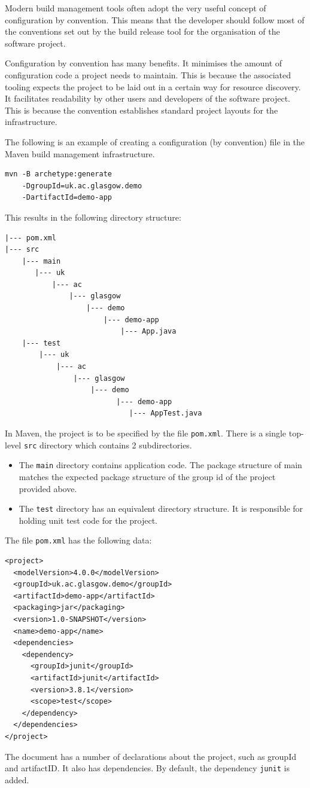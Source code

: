 \documentclass[a4paper, openany]{memoir}
\begin{document}
Modern build management tools often adopt the very useful concept of configuration by convention. This means that the developer should follow most of the conventions set out by the build release tool for the organisation of the software project.

Configuration by convention has many benefits. It minimises the amount of configuration code a project needs to maintain. This is because the associated tooling expects the project to be laid out in a certain way for resource discovery. It facilitates readability by other users and developers of the software project. This is because the convention establishes standard project layouts for the infrastructure. 


The following is an example of creating a configuration (by convention) file in the Maven build management infrastructure.
\begin{verbatim}
mvn -B archetype:generate 
    -DgroupId=uk.ac.glasgow.demo 
    -DartifactId=demo-app
\end{verbatim}
This results in the following directory structure:
\begin{verbatim}
|--- pom.xml
|--- src
    |--- main
       |--- uk
           |--- ac
               |--- glasgow
                   |--- demo
                       |--- demo-app
                           |--- App.java
    |--- test
        |--- uk
            |--- ac
                |--- glasgow
                    |--- demo
                          |--- demo-app
                             |--- AppTest.java
\end{verbatim}
In Maven, the project is to be specified by the file \texttt{pom.xml}. There is a single top-level \texttt{src} directory which contains 2 subdirectories.
\begin{itemize}
    \item The \texttt{main} directory contains application code. The package structure of main matches the expected package structure of the group id of the project provided above.
    \item The \texttt{test} directory has an equivalent directory structure. It is responsible for holding unit test code for the project.
\end{itemize}

The file \texttt{pom.xml} has the following data:
\begin{verbatim}
<project>
  <modelVersion>4.0.0</modelVersion>
  <groupId>uk.ac.glasgow.demo</groupId>
  <artifactId>demo-app</artifactId>
  <packaging>jar</packaging>
  <version>1.0-SNAPSHOT</version>
  <name>demo-app</name>
  <dependencies>
    <dependency>
      <groupId>junit</groupId>
      <artifactId>junit</artifactId>
      <version>3.8.1</version>
      <scope>test</scope>
    </dependency>
  </dependencies>
</project>
\end{verbatim}
The document has a number of declarations about the project, such as groupId and artifactID. It also has dependencies. By default, the dependency \texttt{junit} is added.
\end{document}
